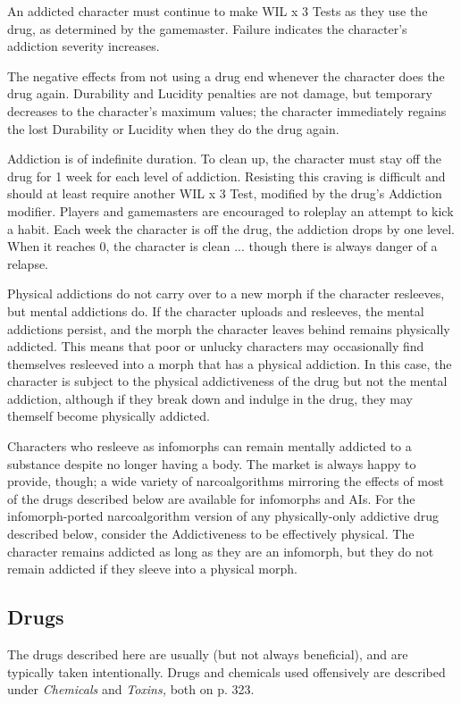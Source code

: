 An addicted character must continue to make WIL 
x 3 Tests as they use the drug, as determined by the 
gamemaster. Failure indicates the character's addiction
severity increases.

The negative effects from not using a drug end 
whenever the character does the drug again. Durability
and Lucidity penalties are not damage, but temporary
decreases to the character's maximum values; the
character immediately regains the lost Durability or 
Lucidity when they do the drug again.

Addiction is of indefinite duration. To clean up, 
the character must stay off the drug for 1 week for 
each level of addiction. Resisting this craving is difficult
and should at least require another WIL x 3
Test, modified by the drug's Addiction modifier. Players
and gamemasters are encouraged to roleplay an
attempt to kick a habit. Each week the character is 
off the drug, the addiction drops by one level. When 
it reaches 0, the character is clean ... though there is 
always danger of a relapse.

Physical addictions do not carry over to a new 
morph if the character resleeves, but mental addictions
do. If the character uploads and resleeves, the
mental addictions persist, and the morph the character
leaves behind remains physically addicted. This
means that poor or unlucky characters may occasionally
find themselves resleeved into a morph that has a
physical addiction. In this case, the character is subject
to the physical addictiveness of the drug but not
the mental addiction, although if they break down 
and indulge in the drug, they may themself become 
physically addicted.

Characters who resleeve as infomorphs can remain 
mentally addicted to a substance despite no longer 
having a body. The market is always happy to provide, 
though; a wide variety of narcoalgorithms mirroring 
the effects of most of the drugs described below are 
available for infomorphs and AIs. For the infomorph-ported
narcoalgorithm version of any physically-only
addictive drug described below, consider the
Addictiveness to be effectively physical. The character 
remains addicted as long as they are an infomorph, 
but they do not remain addicted if they sleeve into a 
physical morph.

\subsection{Drugs}

The drugs described here are usually (but not always 
beneficial), and are typically taken intentionally. Drugs 
and chemicals used offensively are described under 
\textit{Chemicals }and\textit{ Toxins,} both on p. 323.

